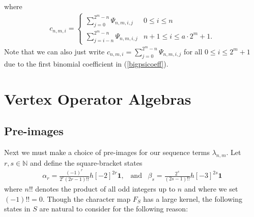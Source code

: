 \documentclass[10pt,a4paper]{amsart}
\numberwithin{equation}{section}
\theoremstyle{definition}
\newcommand{\Heis}{S}
\newcommand{\haupt}{\lambda}
\begin{document}
where
\begin{align}
    c_{n,m,i} = \begin{cases} \sum_{j=0}^{2^{m}-n} \Psi_{n,m,i,j} & 0 \leq i \leq n \\ \sum_{j= i-n}^{2^{m}-n} \Psi_{n,m,i,j} & n+1 \leq i \leq a \cdot 2^{m} +1. \end{cases} \label{hmcoeffs}
\end{align}
Note that we can also just write $c_{n,m,i} = \sum_{j=0}^{2^{m}-n} \Psi_{n,m,i,j}$ for all $0 \leq i \leq 2^{m} +1$ due to the first binomial coefficient in (\ref{bigpsicoeff}). \par 

\section{Vertex Operator Algebras} \label{Section: VOAS}


\subsection{Pre-images} \label{Subsection: Pre-images}

Next we must make a choice of pre-images for our sequence terms $\haupt_{n,m}$. Let $r,s \in \mathbb{N}$ and define the square-bracket states
    \begin{align}
    \alpha_{r} = \frac{(-1)^{r}}{2^{r}(2r-1)!!}h[-2]^{2r}\textbf{1}, \hspace{10pt} \text{and} \hspace{10pt} \beta_{s} = \frac{2^{s}}{(2s-1)!!}h[-3]^{2s}\textbf{1} \label{alphabetastates}
    \end{align}
where $n!!$ denotes the product of all odd integers up to $n$ and where we set $(-1)!! = 0$. Though the character map $F_{\Heis}$ has a large kernel, the following states in $\Heis$ are natural to consider for the following reason: 
\end{document}
